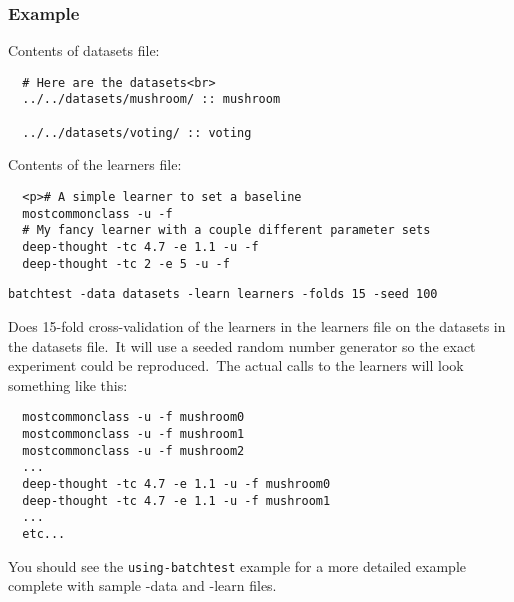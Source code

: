 \subsubsection*{Example}

Contents of datasets file:



\footnotesize\begin{verbatim}
  # Here are the datasets<br>
  ../../datasets/mushroom/ :: mushroom

  ../../datasets/voting/ :: voting
\end{verbatim}\normalsize


Contents of the learners file: 



\footnotesize\begin{verbatim}
  <p># A simple learner to set a baseline
  mostcommonclass -u -f
  # My fancy learner with a couple different parameter sets
  deep-thought -tc 4.7 -e 1.1 -u -f
  deep-thought -tc 2 -e 5 -u -f
\end{verbatim}\normalsize


{\tt batchtest -data datasets -learn learners -folds 15 -seed 100} 

Does 15-fold cross-validation of the learners in the learners file on the datasets in the datasets file.\  It will use a seeded random number generator so the exact experiment could be reproduced.\  The actual calls to the learners will look something like this:



\footnotesize\begin{verbatim}
  mostcommonclass -u -f mushroom0
  mostcommonclass -u -f mushroom1
  mostcommonclass -u -f mushroom2
  ...
  deep-thought -tc 4.7 -e 1.1 -u -f mushroom0
  deep-thought -tc 4.7 -e 1.1 -u -f mushroom1
  ...
  etc...
\end{verbatim}\normalsize


You should see the {\tt using-batchtest} example for a more detailed example complete with sample -data and -learn files.

